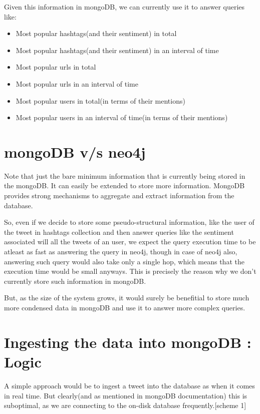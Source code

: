\documentclass[letterpaper,10pt,english]{sphinxmanual}
\begin{document}
Given this information in mongoDB, we can currently use it to answer queries like:
\begin{itemize}
\item {} 
Most popular hashtags(and their sentiment) in total

\item {} 
Most popular hashtags(and their sentiment) in an interval of time

\item {} 
Most popular urls in total

\item {} 
Most popular urls in an interval of time

\item {} 
Most popular users in total(in terms of their mentions)

\item {} 
Most popular users in an interval of time(in terms of their mentions)

\end{itemize}


\section{mongoDB v/s neo4j}
\label{\detokenize{mongoDB_data_ingestion:mongodb-v-s-neo4j}}
Note that just the bare minimum information that is currently being stored in the mongoDB. It can easily be extended to store more information. MongoDB provides strong mechanisms to aggregate and extract information
from the database.

So, even if we decide to store some pseudo-structural information, like the user of the tweet in hashtags collection and then answer queries like the sentiment associated will all the tweets of an user, we expect the query execution time to be atleast as fast as answering the query in neo4j, though in case of neo4j also, answering such query would also take only a single hop, which means that the execution time would be small anyways. This is precisely the reason why we don’t currently store such information in mongoDB.

But, as the size of the system grows, it would surely be benefitial to store much more condensed data in mongoDB and use it to answer more complex queries.


\section{Ingesting the data into mongoDB : Logic}
\label{\detokenize{mongoDB_data_ingestion:ingesting-the-data-into-mongodb-logic}}
A simple approach would be to ingest a tweet into the database as when it comes in real time. But clearly(and as mentioned in mongoDB documentation)
this is suboptimal, as we are connecting to the on-disk database frequently.{[}scheme 1{]}
\end{document}
